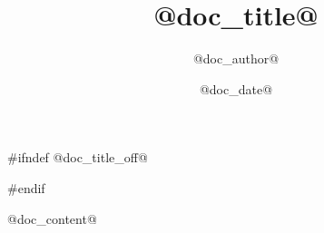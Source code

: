 \documentclass[a4paper,12pt]{@doc_class@}
\title{@doc_title@}
\date{@doc_date@}
\author{@doc_author@}
\begin{document}
#ifndef @doc_title_off@
\maketitle
#endif

\tableofcontents

@doc_content@
\end{document}
